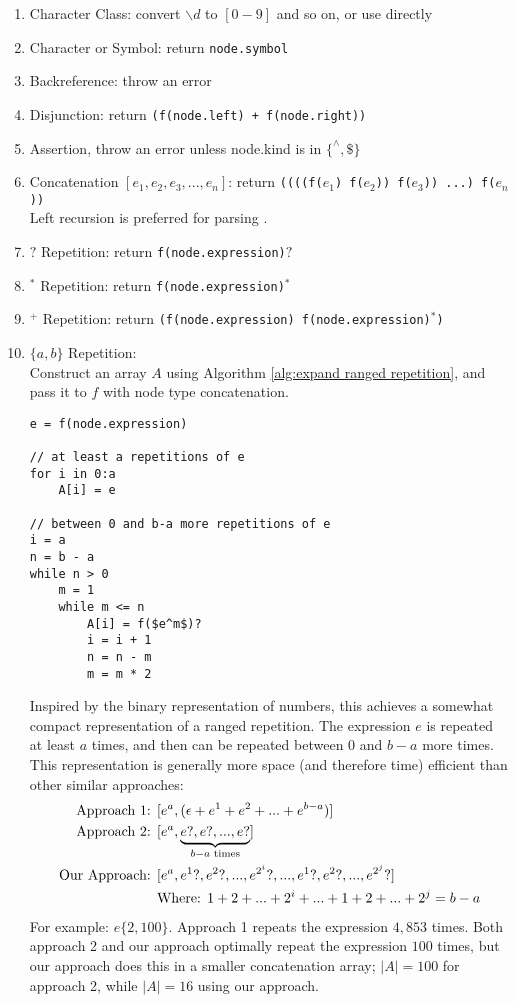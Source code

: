 \begin{enumerate}
  \item Character Class: convert $\backslash d$ to $[0-9]$ and so on, or use directly
  \item Character or Symbol: return \texttt{node.symbol}
  \item Backreference: throw an error
  \item Disjunction: return \texttt{(f(node.left) + f(node.right))}
  \item Assertion, throw an error unless node.kind is in $\{^\wedge, \$\}$
  \item Concatenation $[e_1, e_2, e_3, ..., e_n]$: return \texttt{((((f($e_1$) f($e_2$)) f($e_3$)) ...) f($e_n$))} \\
    Left recursion is preferred for parsing \cite{lark-docs}.
  \item $?$ Repetition: return \texttt{f(node.expression)$?$}
  \item $^*$ Repetition: return \texttt{f(node.expression)$^*$}
  \item $^+$ Repetition: return \texttt{(f(node.expression) f(node.expression)$^*$)}
  \item $\{a,b\}$ Repetition: \\
    Construct an array $A$ using Algorithm \ref{alg:expand ranged repetition}, and pass it to $f$ with node type concatenation. \\
    \begin{lstlisting}[label={alg:expand ranged repetition}, caption={Efficient expansion of a ranged repetition}]
e = f(node.expression)

// at least a repetitions of e
for i in 0:a
    A[i] = e

// between 0 and b-a more repetitions of e
i = a
n = b - a
while n > 0
    m = 1
    while m <= n
        A[i] = f($e^m$)?
        i = i + 1
        n = n - m
        m = m * 2
    \end{lstlisting}    
    Inspired by the binary representation of numbers, this achieves a somewhat compact representation of a ranged repetition. The expression $e$ is repeated at least $a$ times, and then can be repeated between 0 and $b-a$ more times. This representation is generally more space (and therefore time) efficient than other similar approaches: 
    \begin{align*}
      \textrm{Approach 1: } & [e^a, (\epsilon + e^1 + e^2 + ... + e^{b-a})] \\
      \textrm{Approach 2: } & [e^a, \underbrace{e?, e?, ..., e?}_{b-a \textrm{ times}}] \\
      \textrm{Our Approach: } & [e^a, e^1?, e^2?, ..., e^{2^i}?, ..., e^1?, e^2?, ..., e^{2^j}?] \\
      \empty & \textrm{Where: } 1+2+...+2^i+...+1+2+...+2^j=b-a
    \end{align*}
    For example: $e\{2,100\}$. Approach 1 repeats the expression $4,853$ times. Both approach 2 and our approach optimally repeat the expression $100$ times, but our approach does this in a smaller concatenation array; $|A|=100$ for approach 2, while $|A|=16$ using our approach.
\end{enumerate}


